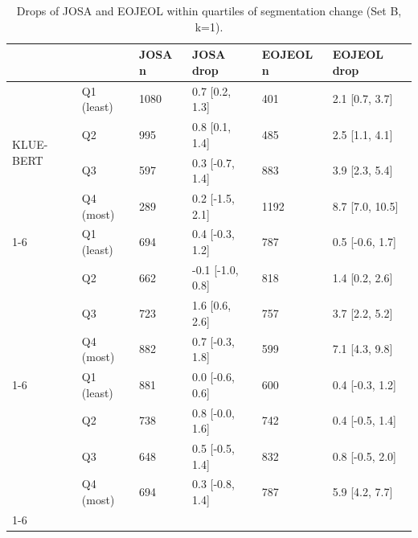\begin{table}
\caption{Drops of JOSA and EOJEOL within quartiles of segmentation change (Set B, k=1).}
\label{tab:table7_matched_change}
\begin{tabular}{llllll}
\toprule
 &  & JOSA n & JOSA drop & EOJEOL n & EOJEOL drop \\
\midrule
\multirow[t]{4}{*}{KLUE-BERT} & Q1 (least) & 1080 & 0.7 [0.2, 1.3] & 401 & 2.1 [0.7, 3.7] \\
 & Q2 & 995 & 0.8 [0.1, 1.4] & 485 & 2.5 [1.1, 4.1] \\
 & Q3 & 597 & 0.3 [-0.7, 1.4] & 883 & 3.9 [2.3, 5.4] \\
 & Q4 (most) & 289 & 0.2 [-1.5, 2.1] & 1192 & 8.7 [7.0, 10.5] \\
\cline{1-6}
\multirow[t]{4}{*}{mBERT} & Q1 (least) & 694 & 0.4 [-0.3, 1.2] & 787 & 0.5 [-0.6, 1.7] \\
 & Q2 & 662 & -0.1 [-1.0, 0.8] & 818 & 1.4 [0.2, 2.6] \\
 & Q3 & 723 & 1.6 [0.6, 2.6] & 757 & 3.7 [2.2, 5.2] \\
 & Q4 (most) & 882 & 0.7 [-0.3, 1.8] & 599 & 7.1 [4.3, 9.8] \\
\cline{1-6}
\multirow[t]{4}{*}{XLM-R} & Q1 (least) & 881 & 0.0 [-0.6, 0.6] & 600 & 0.4 [-0.3, 1.2] \\
 & Q2 & 738 & 0.8 [-0.0, 1.6] & 742 & 0.4 [-0.5, 1.4] \\
 & Q3 & 648 & 0.5 [-0.5, 1.4] & 832 & 0.8 [-0.5, 2.0] \\
 & Q4 (most) & 694 & 0.3 [-0.8, 1.4] & 787 & 5.9 [4.2, 7.7] \\
\cline{1-6}
\bottomrule
\end{tabular}
\end{table}
